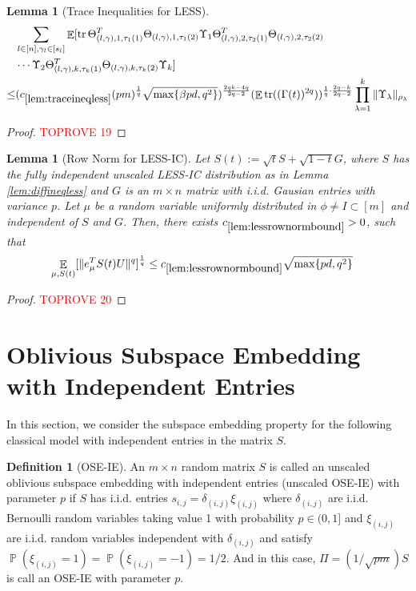 \documentclass[11pt]{amsart}
\numberwithin{equation}{section}
\numberwithin{equation}{section}
\DeclareMathOperator{\E}{\mathbb{E}}
\DeclareMathOperator{\Pb}{\mathbb{P}}
\DeclareMathOperator*{\tr}{tr}
\DeclarePairedDelimiter{\norm}{\lVert}{\rVert}
\newtheorem{lemma}[theorem]{Lemma}
\theoremstyle{remark}
\theoremstyle{definition}
\newtheorem{definition}[theorem]{Definition}
\begin{document}
\begin{lemma} [Trace Inequalities for LESS]
\begin{align*}
    &\sum_{l \in [n], \gamma_l \in [s_l]} \E[ \tr \Theta_{(l,\gamma), 1, \tau_1(1)}^T\Theta_{(l,\gamma), 1, \tau_1(2)}
	\Upsilon_1\Theta_{(l,\gamma), 2, \tau_2(1)}^T\Theta_{(l,\gamma), 2, \tau_2(2)} \\&\cdots
	\Upsilon_2\Theta_{(l,\gamma), k, \tau_k(1)}^T\Theta_{(l,\gamma), k, \tau_k(2)}\Upsilon_k]  \\ \le &
     (c_{\ref*{lem:traceineqless}}(pm)^\frac{1}{q}\sqrt{\max\{\beta pd,q^2\}})^{\frac{2qk-4q}{2q-2}} (\E \tr((\Gamma(t))^{2q}))^{\frac{1}{q} \cdot \frac{2q-k}{2q-2}} \prod\limits_{\lambda  = 1}^{k} {\norm{\Upsilon_\lambda }_{\rho_{\lambda}}} 
\end{align*}


\end{lemma}
\begin{proof}\textcolor{red}{TOPROVE 19}\end{proof}


\begin{lemma}[Row Norm for LESS-IC]\label{lem:lessrownormbound}
    Let $S(t):= \sqrt{t}S + \sqrt{1-t}G$, where $S$ has the fully independent unscaled LESS-IC distribution as in Lemma \ref{lem:diffineqless} and $G$ is an $m \times n$ matrix with i.i.d. Gausian entries with variance $p$. Let $\mu$ be a random variable uniformly distributed in $\phi \neq I \subset [m]$ and independent of $S$ and $G$. Then, there exists $c_{\ref*{lem:lessrownormbound}} > 0$, such that 
    \begin{align*}
        \E_{\mu, S(t)} [ \norm{e_{\mu}^TS(t)U}^{q} ]^\frac{1}{q} &\le c_{\ref*{lem:lessrownormbound}}\sqrt{\max \{ pd, q^2 \}} 
    \end{align*}
\end{lemma}
\begin{proof}\textcolor{red}{TOPROVE 20}\end{proof} \section{Oblivious Subspace Embedding with Independent Entries} \label{sec:oseieproof}

In this section, we consider the subspace embedding property for the following classical model with independent entries in the matrix $S$.

\begin{definition}[OSE-IE]\label{def:oseie}
An $m \times n$ random matrix $S$ is called an unscaled oblivious subspace embedding with independent entries (unscaled OSE-IE) with parameter $p$ if $S$ has i.i.d. entries $s_{i,j}=\delta_{(i,j)} \xi_{(i,j)}$ where $\delta_{(i,j)}$ are i.i.d. Bernoulli random variables taking value 1 with probability $p \in (0,1]$ and $\xi_{(i,j)}$ are i.i.d. random variables independent with $\delta_{(i,j)}$ and satisfy $\Pb(\xi_{(i,j)}=1)=\Pb(\xi_{(i,j)}=-1)=1/2$. And in this case, $\Pi = (1/\sqrt{pm})S$ is call an OSE-IE with parameter $p$.
\end{definition}
\end{document}
